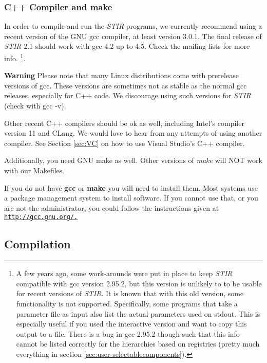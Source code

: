 \documentclass{article}
\def\R2Lurl#1#2{\mbox{\href{#1}{\tt #2}}}
\begin{document}
\subsubsection{
C++ Compiler and make}

In order to compile and run the \textit{STIR} programs, we currently recommend 
using a recent version of the GNU gcc compiler, at least version 
3.0.1. The final release of \textit{STIR} 2.1 should work with gcc 4.2 up to 4.5.
Check the mailing lists for more info.
\footnote{{\small A few years ago, some work-arounds were put in place to 
keep \textit{STIR} compatible with gcc version 2.95.2, but this version is unlikely to
to be usable for recent versions of \textit{STIR}. It is known that with this
old version, some functionality is not supported. Specifically, 
some programs that take a parameter file as input also list the 
actual parameters used on stdout. This is especially useful if 
you used the interactive version and want to copy this output 
to a file. There is a bug in gcc 2.95.2 though such that this 
info cannot be listed correctly for the hierarchies based on 
registries (pretty much everything in section 
\ref{sec:user-selectablecomponents}).}}. 


\textbf{Warning} Please note that many Linux distributions come with 
prerelease versions of gcc. These versions are sometimes not as stable
as the normal gcc releases, especially for C++ code.
We discourage using such versions for \textit{STIR} (check with gcc -v).



Other recent C++ compilers should be ok as well, including Intel's compiler
version 11 and CLang.
We would love 
to hear from any attempts of using another compiler. See Section 
\ref{sec:VC}
on how to use Visual Studio's C++ compiler.


Additionally, you need GNU make as well. Other versions of \textit{make} 
will NOT work with our Makefiles.


If you do not have \textbf{gcc} or \textbf{make} you will need to 
install them. Most systems use a package management system to install software. 
If you cannot use that, or you are not the administrator, you 
could follow the instructions given at \R2Lurl{http://gcc.gnu.org/ }{http://gcc.gnu.org/.}



\subsection{
Compilation}
\end{document}
